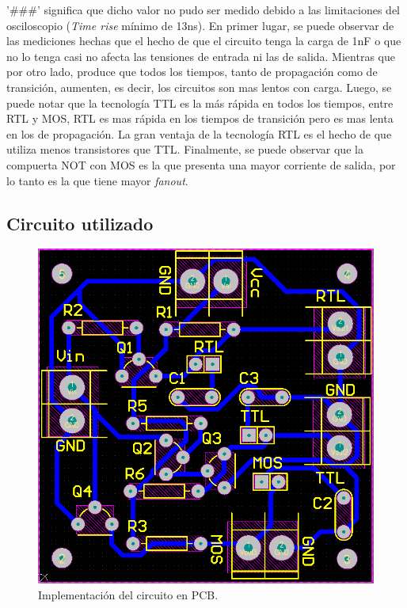 \noindent
'\#\#\#' significa que dicho valor no pudo ser medido debido a las limitaciones del osciloscopio (\textit{Time rise} m\'inimo de 13ns).
\noindent\newline
\vspace{5mm}
\newline
En primer lugar, se puede observar de las mediciones hechas que el hecho de que el circuito tenga la carga de 1nF o que no lo tenga casi no afecta las tensiones de entrada ni las de salida. Mientras que por otro lado, produce que todos los tiempos, tanto de propagaci\'on como de transici\'on, aumenten, es decir, los circuitos son mas lentos con carga. \newline
Luego, se puede notar que la tecnolog\'ia TTL es la m\'as r\'apida en todos los tiempos, entre RTL y MOS, RTL es mas r\'apida en los tiempos de transici\'on pero es mas lenta en los de propagaci\'on. La gran ventaja de la tecnolog\'ia RTL es el hecho de que utiliza menos transistores que TTL. Finalmente, se puede observar que la compuerta NOT con MOS es la que presenta una mayor corriente de salida, por lo tanto es la que tiene mayor \textit{fanout}.

\subsection{Circuito utilizado}
\label{ej1_pcb}
\begin{figure}[H]
\center
    \includegraphics[scale = 0.45]{figs/ej1/ej1_PCB.png}
    \caption{Implementaci\'on del circuito en PCB.}
\label{fig:ej1_pcb}
\end{figure}
\noindent